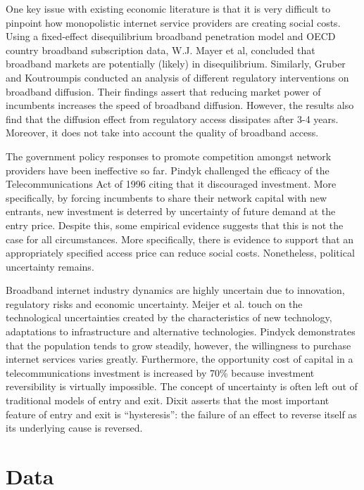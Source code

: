 \documentclass[a4paper,oneside]{article}
\begin{document}
One key issue with existing economic literature is that it is very difficult to pinpoint how monopolistic internet service providers are creating social costs. 
Using a fixed-effect disequilibrium broadband penetration model and OECD country broadband subscription data, W.J. Mayer et al, concluded that broadband markets are potentially (likely) in disequilibrium. 
Similarly, Gruber and Koutroumpis conducted an analysis of different regulatory interventions on broadband diffusion. 
Their findings assert that reducing market power of incumbents increases the speed of broadband diffusion. 
However, the results also find that the diffusion effect from regulatory access dissipates after 3-4 years. 
Moreover, it does not take into account the quality of broadband access. 

The government policy responses to promote competition amongst network providers have been ineffective so far. 
Pindyk challenged the efficacy of the Telecommunications Act of 1996 citing that it discouraged investment. 
More specifically, by forcing incumbents to share their network capital with new entrants, new investment is deterred by uncertainty of future demand at the entry price. 
Despite this, some empirical evidence suggests that this is not the case for all circumstances. 
More specifically, there is evidence to support that an appropriately specified access price can reduce social costs.
Nonetheless, political uncertainty remains.

Broadband internet industry dynamics are highly uncertain due to innovation, regulatory risks and economic uncertainty. 
Meijer et al. touch on the technological uncertainties created by the characteristics of new technology, adaptations to infrastructure and alternative technologies. 
Pindyck demonstrates that the population tends to grow steadily, however, the willingness to purchase internet services varies greatly. 
Furthermore, the opportunity cost of capital in a telecommunications investment is increased by 70\% because investment reversibility is virtually impossible.
The concept of uncertainty is often left out of traditional models of entry and exit. Dixit asserts that the most important feature of entry and exit is “hysteresis”: the failure of an effect to reverse itself as its underlying cause is reversed. 

\section{Data}
\end{document}
